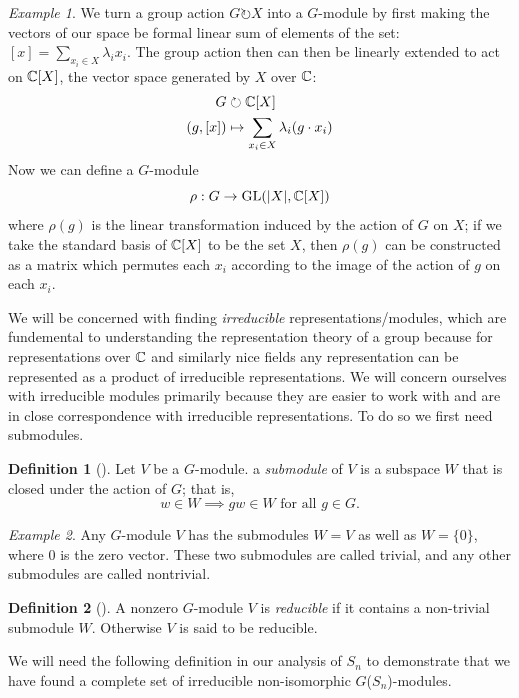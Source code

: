 \documentclass[12pt,twoside]{reedthesis}
\theoremstyle{plain}   %
\theoremstyle{definition}
\newtheorem{defn}{Definition}[section]
\theoremstyle{remark}
\newtheorem{ex}{Example}[section]
\numberwithin{equation}{section}
\def\GL{\mathrm{GL}} \def\SL{\mathrm{SL}}  \def\SP{\mathrm{SL}}\def\OG{\mathrm{O}}
\def\acts{\circlearrowright} %
\begin{document}
  \begin{ex} We turn a group action $G \acts X$ into a $G$-module by first making the vectors of our space be
    formal linear sum of elements of the set: $[x] = \sum_{x_i \in X} \lambda_i x_i$.
    The group action then can then be linearly extended to act on $\mathbb{C}[X]$, the vector space generated by $X$ over $\mathbb{C}$:
    \begin{align*}
      G &\acts \CC [X] \\
      (g,[x]) &\mapsto \sum_{x_i \in X} \lambda_i (g \cdot x_i)
    \end{align*}
    Now we can define a $G$-module
    \[ \rho: G \to \GL(|X|, \CC [X])\]
    where $\rho(g)$ is the linear transformation induced by the action of $G$ on $X$; if we take the standard basis of $\mathbb{C} [X]$ to be
    the set $X$, then $\rho(g)$ can be constructed as a matrix which permutes each $x_i$ according to the image of the action of $g$ on each $x_i$.
  \end{ex}
  We will be concerned with finding \emph{irreducible} representations/modules,
  which are fundemental to understanding the representation theory of a group because
  for representations over $\mathbb{C}$ and similarly nice fields any representation can be represented as a product of irreducible representations.
  We will concern ourselves with irreducible modules primarily because they are easier to work with and are in close correspondence
  with irreducible representations. To do so we first need submodules.
  \begin{defn}[{\cite[Definition 1.4.1]{sagan}}]
    Let $V$ be a $G$-module. a \emph{submodule}
    of $V$ is a subspace $W$ that is closed under the action of $G$; that is,
    \[w \in W \implies gw \in W \text{ for all } g \in G.\]
  \end{defn}
  \begin{ex}
    Any $G$-module $V$ has the submodules $W=V$ as well as $W= \{0\}$, where $0$ is the zero vector.
    These two submodules are called trivial, and any other submodules are called nontrivial.
  \end{ex}
  \begin{defn}[{\cite[Definition 1.4.1]{sagan}}]
    A nonzero $G$-module $V$ is \emph{reducible} if it contains a non-trivial submodule $W$.
    Otherwise $V$ is said to be reducible.
  \end{defn}

  We will need the following definition in our analysis of $S_n$ to demonstrate that we have found a complete set of irreducible non-isomorphic $G$($S_n$)-modules.
\end{document}
